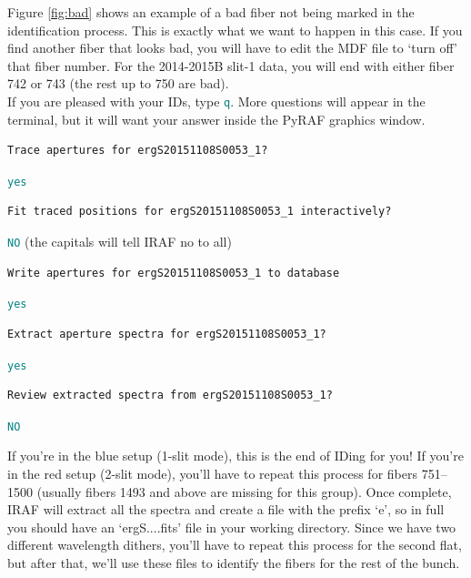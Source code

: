 \documentclass[12pt]{report}
\newcommand{\ty}[1]{\textcolor{teal}{\texttt{#1}}}
\begin{document}
\begin{enumerate}
Figure \autoref{fig:bad} shows an example of a bad fiber not being marked in the identification process. This is exactly what we want to happen in this case. If you find another fiber that looks bad, you will have to edit the MDF file to `turn off' that fiber number. For the 2014-2015B slit-1 data, you will end with either fiber 742 or 743 (the rest up to 750 are bad). \\

If you are pleased with your IDs, type \ty{q}. More questions will appear in the terminal, but it will want your answer inside the PyRAF graphics window.

\begin{verbatim}
Trace apertures for ergS20151108S0053_1? 
\end{verbatim}

\ty{yes}

\begin{verbatim}
Fit traced positions for ergS20151108S0053_1 interactively?
\end{verbatim}

\ty{NO} (the capitals will tell IRAF no to all)

\begin{verbatim}
Write apertures for ergS20151108S0053_1 to database
\end{verbatim}

\ty{yes}

\begin{verbatim}
Extract aperture spectra for ergS20151108S0053_1?
\end{verbatim}

\ty{yes}

\begin{verbatim}
Review extracted spectra from ergS20151108S0053_1?
\end{verbatim}

\ty{NO}

If you're in the blue setup (1-slit mode), this is the end of IDing for you! If you're in the red setup (2-slit mode), you'll have to repeat this process for fibers 751--1500 (usually fibers 1493 and above are missing for this group). Once complete, IRAF will extract all the spectra and create a file with the prefix `e', so in full you should have an `ergS....fits' file in your working directory. Since we have two different wavelength dithers, you'll have to repeat this process for the second flat, but after that, we'll use these files to identify the fibers for the rest of the bunch.

\end{enumerate}
\end{document}
